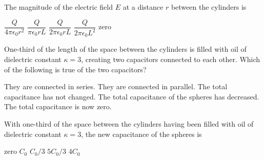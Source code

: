 \documentclass{../../../oss-apphys-exam}
\newcounter{last}
\begin{document}
\begin{questions}
  \question The magnitude of the electric field $E$ at a distance $r$ between
  the cylinders is
  \begin{choices}
    \choice $\dfrac Q{4\pi\epsilon_0r^2}$
    \choice $\dfrac Q{\pi\epsilon_0rL}$
    \choice $\dfrac Q{2\pi\epsilon_0rL}$
    \choice $\dfrac Q{2\pi\epsilon_0L^2}$
    \choice zero
  \end{choices}
  \label{cyl1}
    
  \question One-third of the length of the space between the cylinders is
  filled with oil of dielectric constant $\kappa=3$, creating two capacitors
  connected to each other. Which of the following is true of the two
  capacitors?
  \begin{choices}
    \choice They are connected in series.
    \choice They are connected in parallel.
    \choice The total capacitance has not changed.
    \choice The total capacitance of the spheres has decreased.
    \choice The total capacitance is now zero.
  \end{choices}
    
  \question With one-third of the space between the cylinders having been
  filled with oil of dielectric constant $\kappa=3$, the new capacitance of
  the spheres is
  \begin{choices}
    \choice zero
    \choice $C _0$
    \choice $C_0/3$
    \choice $5C_0/3$
    \choice $4C_0$
  \end{choices}
  \label{cyl2}
\end{questions}
\setcounter{last}{\value{question}}
\newpage

\end{document}
